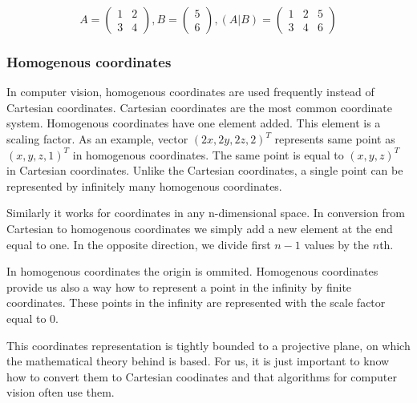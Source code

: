 \[
A = \begin{pmatrix}
        1 & 2 \\
        3 & 4
\end{pmatrix},
B = \begin{pmatrix}
5 \\
6
\end{pmatrix},
(A|B) = \begin{pmatrix}
        1 & 2 & 5 \\
        3 & 4 & 6
\end{pmatrix}
\]

\subsubsection*{Homogenous coordinates}

In computer vision, homogenous coordinates are used frequently instead of
Cartesian coordinates. Cartesian coordinates are the most common coordinate
system.  Homogenous coordinates have one element added. This element is a
scaling factor. As an example, vector $(2x, 2y, 2z, 2)^T$ represents same point
as $(x, y, z, 1)^T$ in homogenous coordinates. The same point is equal to $(x,
y, z)^T$ in Cartesian coordinates. Unlike the Cartesian coordinates, a single
point can be represented by infinitely many homogenous coordinates.

Similarly it works for coordinates in any n-dimensional space. In conversion
from Cartesian to homogenous coordinates we simply add a new element at the end
equal to one. In the opposite direction, we divide first $n-1$ values by the
$n$th.

In homogenous coordinates the origin is ommited. Homogenous coordinates provide
us also a way how to represent a point in the infinity by finite coordinates.
These points in the infinity are represented with the scale factor equal to 0.

This coordinates representation is tightly bounded to a projective plane, on
which the mathematical theory behind is based. For us, it is just important to
know how to convert them to Cartesian coodinates and that algorithms for
computer vision often use them.
